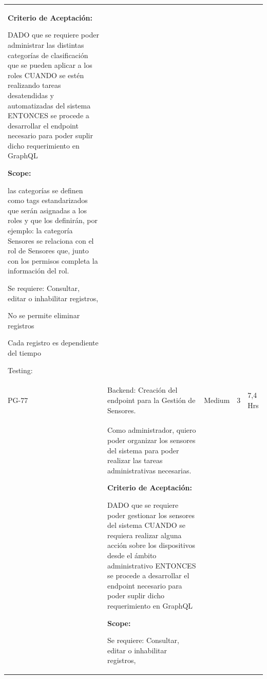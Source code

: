\documentclass[11pt]{charter}
\begin{document}
\begin{landscape}
\begin{tabularx}{\linewidth}{@{}|p{1.3cm}|p{17cm}|p{1.7cm}|p{1.5cm}|p{1.7cm}|@{}}
\begin{description}
                   \item \textbf{Criterio de Aceptación:}                 
                   \item DADO que se requiere poder administrar las distintas categorías de   clasificación que se pueden aplicar a los roles CUANDO se estén realizando tareas desatendidas y automatizadas del   sistema ENTONCES se procede a desarrollar el endpoint necesario para poder suplir dicho requerimiento en GraphQL                
                   \item \textbf{Scope:} 
                         \item las categorías se definen como tags estandarizados que serán asignadas a   los roles y que los definirán, por ejemplo: la categoría Sensores se   relaciona con el rol de Sensores que, junto con los permisos completa la   información del rol.                  
                         \item Se requiere: Consultar, editar o inhabilitar registros, 
                         \item No se permite eliminar registros 
                         \item Cada registro es dependiente del tiempo                 
                   \item Testing:
            \end{description}       &  &     & \\
PG-77    & Backend: Creación del endpoint   para la Gestión de Sensores.      & Medium             & 3   & 7,4  Hrs          \\
         &  \begin{description}                 
                   \item Como administrador, quiero poder   organizar los sensores del sistema para poder realizar las tareas   administrativas necesarias.                 
                   \item \textbf{Criterio de Aceptación:}                 
                   \item DADO que se requiere poder gestionar los sensores del sistema CUANDO se requiera realizar alguna acción sobre los dispositivos desde el   ámbito administrativo ENTONCES se procede a desarrollar el endpoint necesario para poder suplir dicho requerimiento en GraphQL                
                   \item \textbf{Scope:}                  
                         \item Se requiere: Consultar, editar o inhabilitar registros, 

\end{description}
\end{tabularx}
\end{landscape}
\end{document}
